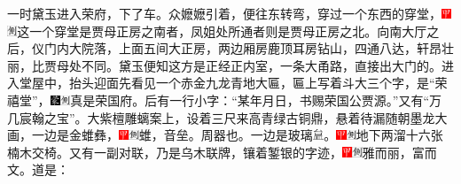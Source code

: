 一时黛玉进入荣府，下了车。众嬷嬷引着，便往东转弯，穿过一个东西的穿堂，{\includegraphics[width=3mm]{../Images/00002}\includegraphics[width=3mm]{../Images/00011}\footnotesize \kaishu 这一个穿堂是贾母正房之南者，凤姐处所通者则是贾母正房之北。}向南大厅之后，仪门内大院落，上面五间大正房，两边厢房鹿顶耳房钻山，四通八达，轩昂壮丽，比贾母处不同。黛玉便知这方是正经正内室，一条大甬路，直接出大门的。进入堂屋中，抬头迎面先看见一个赤金九龙青地大匾，匾上写着斗大三个字，是“荣禧堂”，{\includegraphics[width=3mm]{../Images/00006}\includegraphics[width=3mm]{../Images/00011}\footnotesize \kaishu 真是荣国府。}后有一行小字：“某年月日，书赐荣国公贾源。”又有“万几宸翰之宝”。大紫檀雕螭案上，设着三尺来高青绿古铜鼎，悬着待漏随朝墨龙大画，一边是金蜼彝，{\includegraphics[width=3mm]{../Images/00002}\includegraphics[width=3mm]{../Images/00011}\footnotesize \kaishu 蜼，音垒。周器也。}一边是玻璃\includegraphics[width=9.4pt,height=9.4pt,align=c,vshift=1pt]{../Images/00013}。{\includegraphics[width=3mm]{../Images/00002}\includegraphics[width=3mm]{../Images/00011}\footnotesize {}}地下两溜十六张楠木交椅。又有一副对联，乃是乌木联牌，镶着錾银的字迹，{\includegraphics[width=3mm]{../Images/00002}\includegraphics[width=3mm]{../Images/00011}\footnotesize \kaishu 雅而丽，富而文。}道是：

